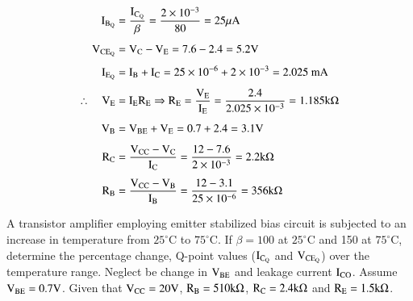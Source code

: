 \begin{solution}
\begin{align*}
\textrm{I}_{\textrm{B}_{\textrm{Q}}} &= \frac{\textrm{I}_{\textrm{C}_{\textrm{Q}}}}{\beta}=\dfrac{2\times 10^{-3}}{80}=25\mu\textrm{A}\\[4pt]
\textrm{V}_{\text{CE}_{\textrm{Q}}} &= \textrm{V}_{\textrm{C}}-\textrm{V}_{\textrm{E}}=7.6-2.4=5.2\textrm{V}\\[4pt]
\textrm{I}_{\textrm{E}_{\textrm{Q}}} &= \textrm{I}_{\textrm{B}}+\textrm{I}_{\textrm{C}}=25\times 10^{-6}+2\times 10^{-3}=2.025\text{~mA}\\[4pt]
\therefore\quad \textrm{V}_{\textrm{E}} &= \textrm{I}_{\textrm{E}}\textrm{R}_{\textrm{E}}\Rightarrow \textrm{R}_{\textrm{E}}=\dfrac{\textrm{V}_{\textrm{E}}}{\textrm{I}_{\textrm{E}}}=\dfrac{2.4}{2.025\times 10^{-3}}=1.185\textrm{k}\Omega\\[4pt]
\textrm{V}_{\textrm{B}} &= \textrm{V}_{\textrm{B}\textrm{E}}+\textrm{V}_{\textrm{E}}=0.7+2.4=3.1\textrm{V}\\[4pt]
\textrm{R}_{\textrm{C}} &= \frac{\textrm{V}_{\text{CC}}-\textrm{V}_{\textrm{C}}}{\textrm{I}_{\textrm{C}}}=\frac{12-7.6}{2\times 10^{-3}}=2.2\textrm{k}\Omega\\[4pt]
\textrm{R}_{\textrm{B}} &= \frac{\textrm{V}_{\text{CC}}-\textrm{V}_{\textrm{B}}}{\textrm{I}_{\textrm{B}}}=\frac{12-3.1}{25\times 10^{-6}}=356\textrm{k}\Omega
\end{align*}
\end{solution}

\begin{problem}\label{prob3.6}
A transistor amplifier employing emitter stabilized bias circuit is subjected to an increase in temperature from $25^{\circ}$C to $75^{\circ}$C. If $\beta=100$ at $25^{\circ}$C and 150 at $75^{\circ}$C, determine the percentage change, Q-point values ($\textrm{I}_{\textrm{C}_{\textrm{Q}}}$ and $\textrm{V}_{\text{CE}_{\textrm{Q}}}$) over the temperature range. Neglect be change in $\textrm{V}_{\text{BE}}$ and leakage current $\textrm{I}_{\text{CO}}$. Assume $\textrm{V}_{\text{BE}}=0.7\textrm{V}$. Given that $\textrm{V}_{\text{CC}}=20\textrm{V}$, $\textrm{R}_{\textrm{B}}=510\textrm{k}\Omega$, $\textrm{R}_{\textrm{C}}=2.4\textrm{k}\Omega$ and $\textrm{R}_{\textrm{E}}=1.5\textrm{k}\Omega$.  
\end{problem}

